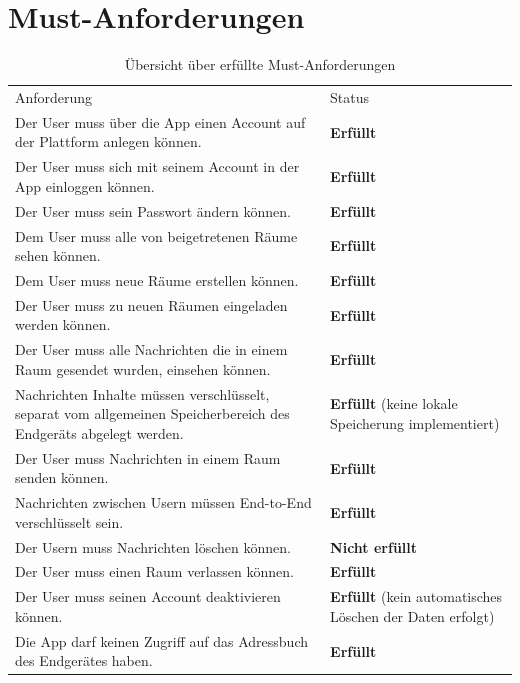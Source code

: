     \newpage
    \section{Must-Anforderungen}\label{sec:must-anforderungen}
    \begin{table}[h]
        \centering
        \begin{tabular}{p{}|p{}}
            Anforderung & Status\\
            \cline{1-2}
            Der User muss über die App einen Account auf der Plattform anlegen können.
            &  \textbf{Erfüllt} \\
            \cline{1-2}
            Der User muss sich mit seinem Account in der App einloggen können. &  \textbf{Erfüllt} \\
            \cline{1-2}
            Der User muss sein Passwort ändern können. & \textbf{Erfüllt}  \\
            \cline{1-2}
            Dem User muss alle von beigetretenen Räume sehen können. &  \textbf{Erfüllt} \\
            \cline{1-2}
            Dem User muss neue Räume erstellen können. & \textbf{Erfüllt} \\
            \cline{1-2}
            Der User muss zu neuen Räumen eingeladen werden können. & \textbf{Erfüllt} \\
            \cline{1-2}
            Der User muss alle Nachrichten die in einem Raum gesendet wurden, einsehen können. & \textbf{Erfüllt} \\
            \cline{1-2}
            Nachrichten Inhalte müssen verschlüsselt, separat vom allgemeinen Speicherbereich des Endgeräts abgelegt werden. & \textbf{Erfüllt} (keine lokale Speicherung implementiert) \\
            \cline{1-2}
            Der User muss Nachrichten in einem Raum senden können. & \textbf{Erfüllt} \\
            \cline{1-2}
            Nachrichten zwischen Usern müssen End-to-End verschlüsselt sein. & \textbf{Erfüllt} \\
            \cline{1-2}
            Der Usern muss Nachrichten löschen können. & \textbf{Nicht erfüllt} \\
            \cline{1-2}
            Der User muss einen Raum verlassen können. & \textbf{Erfüllt} \\
            \cline{1-2}
            Der User muss seinen Account deaktivieren können. & \textbf{Erfüllt} (kein automatisches Löschen der Daten erfolgt)\\
            \cline{1-2}
            Die App darf keinen Zugriff auf das Adressbuch des Endgerätes haben. & \textbf{Erfüllt}
        \end{tabular}
        \caption{Übersicht über erfüllte Must-Anforderungen}
        \label{tab:erfüllte-must-anforderungen}
    \end{table}

